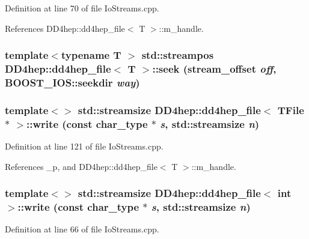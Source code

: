 Definition at line 70 of file IoStreams.cpp.

References DD4hep::dd4hep\_\-file$<$ T $>$::m\_\-handle.\hypertarget{class_d_d4hep_1_1dd4hep__file_a202c036e68f217e7a902819eb83ec2f3}{
\subsubsection[{seek}]{\setlength{\rightskip}{0pt plus 5cm}template$<$typename T $>$ std::streampos {\bf DD4hep::dd4hep\_\-file}$<$ {\bf T} $>$::seek ({\bf stream\_\-offset} {\em off}, \/  BOOST\_\-IOS::seekdir {\em way})}}
\label{class_d_d4hep_1_1dd4hep__file_a202c036e68f217e7a902819eb83ec2f3}
\hypertarget{class_d_d4hep_1_1dd4hep__file_aa79fcf34ccb19554db07c5ccb604a9fa}{
\subsubsection[{write}]{\setlength{\rightskip}{0pt plus 5cm}template$<$$>$ std::streamsize {\bf DD4hep::dd4hep\_\-file}$<$ TFile $\ast$ $>$::write (const {\bf char\_\-type} $\ast$ {\em s}, \/  std::streamsize {\em n})}}
\label{class_d_d4hep_1_1dd4hep__file_aa79fcf34ccb19554db07c5ccb604a9fa}


Definition at line 121 of file IoStreams.cpp.

References \_\-p, and DD4hep::dd4hep\_\-file$<$ T $>$::m\_\-handle.\hypertarget{class_d_d4hep_1_1dd4hep__file_a0f35ab39573568a2ee21ea0bf8e837a1}{
\subsubsection[{write}]{\setlength{\rightskip}{0pt plus 5cm}template$<$$>$ std::streamsize {\bf DD4hep::dd4hep\_\-file}$<$ int $>$::write (const {\bf char\_\-type} $\ast$ {\em s}, \/  std::streamsize {\em n})}}
\label{class_d_d4hep_1_1dd4hep__file_a0f35ab39573568a2ee21ea0bf8e837a1}


Definition at line 66 of file IoStreams.cpp.

